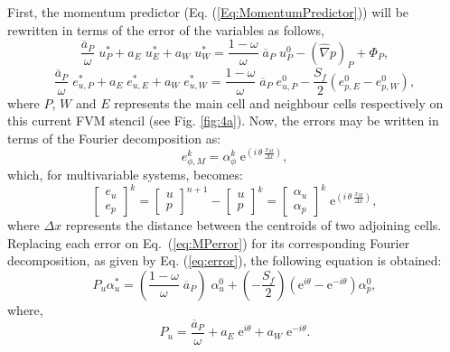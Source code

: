 \documentclass[final,3p,times,11pt,onecolumn]{myElsarticle}
\numberwithin{equation}{section}
\begin{document}
First, the momentum predictor (Eq. (\ref{Eq:MomentumPredictor})) will be rewritten in terms of the error of the variables as follows,
\begin{equation}
    \dfrac{\overline{a}_P}{\omega} \; u_P^* + a_E \; u_E^* + a_W \; u_W^* = \dfrac{1-\omega}{\omega} \; \overline{a}_P \; u_P^0 - (\hat{\nabla} p)_P + \Phi_P,
\end{equation}
\begin{equation}
    \dfrac{\overline{a}_P}{\omega} \; e_{u,P}^* + a_E \; e_{u,E}^* + a_W \; e_{u,W}^* = \dfrac{1-\omega}{\omega} \; \overline{a}_P \; e_{u,P}^0 - \dfrac{S_f}{2} (e^0_{p,E}-e^0_{p,W}),
    \label{eq:MPerror}
\end{equation}
where $P$, $W$ and $E$ represents the main cell and neighbour cells respectively on this current FVM stencil (see Fig. \ref{fig:4a}).
Now, the errors may be written in terms of the Fourier decomposition as:
\begin{equation}
    e^k_{\phi,M} = \alpha^k_{\phi} \; \text{e}^{\left( i \, \theta \, \frac{x_M}{\Delta x}\right)},
    \label{eq:error}
\end{equation}
which, for multivariable systems, becomes:
\begin{equation}
\begin{bmatrix}
e_u \\
e_p 
\end{bmatrix}^{k}
=
\begin{bmatrix}
u \\
p 
\end{bmatrix}^{n+1}
-\begin{bmatrix}
u \\
p 
\end{bmatrix}^{k}
=
\begin{bmatrix}
\alpha_u \\
\alpha_p 
\end{bmatrix}^{k}
\; \text{e}^{\left( i \, \theta \, \frac{x_M}{\Delta x}\right)},
\label{eq:fou1}
\end{equation}
where $\Delta x$ represents the distance between the centroids of two adjoining cells.
Replacing each error on Eq.~(\ref{eq:MPerror}) for its corresponding Fourier decomposition, as given by Eq. (\ref{eq:error}), the following equation is obtained:
\begin{equation}
    P_u \alpha_u^* = \left( \dfrac{1-\omega}{\omega} \; \overline{a}_P \right) \; \alpha_u^0 + \left(- \dfrac{S_f}{2} \right) \left(\text{e}^{i \theta} -  \text{e}^{-i \theta} \right) \alpha_p^0,
    \label{eq:MPfou}
\end{equation}
where,
\begin{equation}
P_u = \dfrac{\overline{a}_P}{\omega}  + a_E \; \text{e}^{i \theta} + a_W \; \text{e}^{-i \theta}.
\end{equation}
\end{document}
